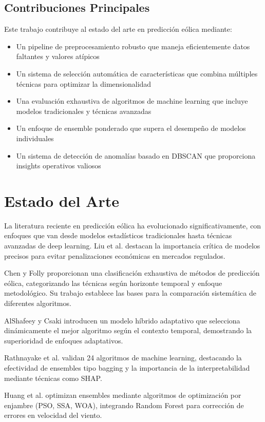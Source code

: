 \documentclass[conference]{IEEEtran}
\begin{document}
	\subsection{Contribuciones Principales}
	Este trabajo contribuye al estado del arte en predicción eólica mediante:
	\begin{itemize}
		\item Un pipeline de preprocesamiento robusto que maneja eficientemente datos faltantes y valores atípicos
		\item Un sistema de selección automática de características que combina múltiples técnicas para optimizar la dimensionalidad
		\item Una evaluación exhaustiva de algoritmos de machine learning que incluye modelos tradicionales y técnicas avanzadas
		\item Un enfoque de ensemble ponderado que supera el desempeño de modelos individuales
		\item Un sistema de detección de anomalías basado en DBSCAN que proporciona insights operativos valiosos
	\end{itemize}
	
	\section{Estado del Arte}
	La literatura reciente en predicción eólica ha evolucionado significativamente, con enfoques que van desde modelos estadísticos tradicionales hasta técnicas avanzadas de deep learning. Liu et al. \cite{liu2023day} destacan la importancia crítica de modelos precisos para evitar penalizaciones económicas en mercados regulados.
	
	Chen y Folly \cite{chen2018wind} proporcionan una clasificación exhaustiva de métodos de predicción eólica, categorizando las técnicas según horizonte temporal y enfoque metodológico. Su trabajo establece las bases para la comparación sistemática de diferentes algoritmos.
	
	AlShafeey y Csaki \cite{alshafeey2024adaptive} introducen un modelo híbrido adaptativo que selecciona dinámicamente el mejor algoritmo según el contexto temporal, demostrando la superioridad de enfoques adaptativos.
	
	Rathnayake et al. \cite{rathnayake2025predicting} validan 24 algoritmos de machine learning, destacando la efectividad de ensembles tipo bagging y la importancia de la interpretabilidad mediante técnicas como SHAP.
	
	Huang et al. \cite{huang2023ensemble} optimizan ensembles mediante algoritmos de optimización por enjambre (PSO, SSA, WOA), integrando Random Forest para corrección de errores en velocidad del viento.
	
\end{document}
